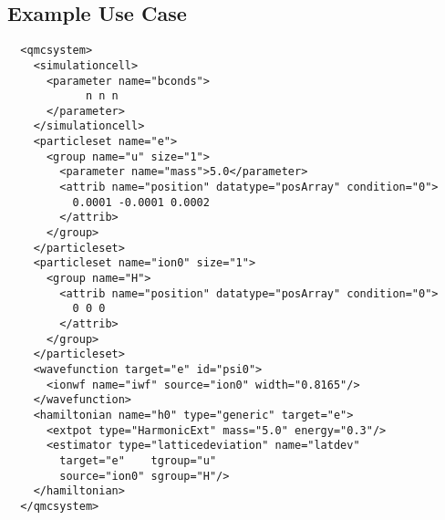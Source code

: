 \subsection{Example Use Case}
\begin{lstlisting}
  <qmcsystem>
    <simulationcell>
      <parameter name="bconds">
            n n n
      </parameter>
    </simulationcell>
    <particleset name="e">
      <group name="u" size="1">
        <parameter name="mass">5.0</parameter>
        <attrib name="position" datatype="posArray" condition="0">
          0.0001 -0.0001 0.0002
        </attrib>
      </group>
    </particleset>
    <particleset name="ion0" size="1">
      <group name="H">
        <attrib name="position" datatype="posArray" condition="0">
          0 0 0
        </attrib>
      </group>
    </particleset>
    <wavefunction target="e" id="psi0">
      <ionwf name="iwf" source="ion0" width="0.8165"/>
    </wavefunction>
    <hamiltonian name="h0" type="generic" target="e">
      <extpot type="HarmonicExt" mass="5.0" energy="0.3"/>
      <estimator type="latticedeviation" name="latdev" 
        target="e"    tgroup="u" 
        source="ion0" sgroup="H"/>
    </hamiltonian>
  </qmcsystem>
\end{lstlisting}

